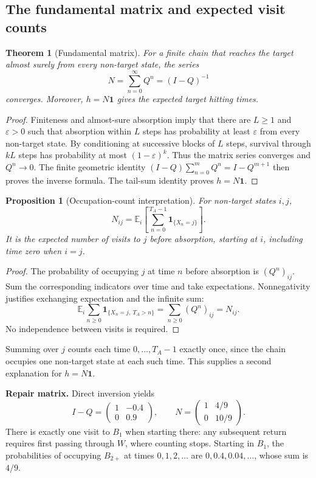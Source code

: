 \documentclass[11pt]{article}
\newtheorem{theorem}[definition]{Theorem}
\newtheorem{proposition}[definition]{Proposition}
\theoremstyle{remark}\newtheorem{remark}[definition]{Remark}
\newcommand{\E}{\mathbb E}\newcommand{\Prob}{\mathbb P}
\begin{document}
\clearpage
\subsection{The fundamental matrix and expected visit counts}
\begin{theorem}[Fundamental matrix]
For a finite chain that reaches the target almost surely from every non-target state, the series
\[
\boxed{N=\sum_{n=0}^\infty Q^n=(I-Q)^{-1}}
\]
converges. Moreover, $h=N\mathbf1$ gives the expected target hitting times.
\end{theorem}
\begin{proof}
Finiteness and almost-sure absorption imply that there are $L\geq1$ and $\varepsilon>0$ such that absorption within $L$ steps has probability at least $\varepsilon$ from every non-target state. By conditioning at successive blocks of $L$ steps, survival through $kL$ steps has probability at most $(1-\varepsilon)^k$. Thus the matrix series converges and $Q^n\to0$. The finite geometric identity
$(I-Q)\sum_{n=0}^mQ^n=I-Q^{m+1}$
then proves the inverse formula. The tail-sum identity proves $h=N\mathbf1$.
\end{proof}
\begin{proposition}[Occupation-count interpretation]
For non-target states $i,j$,
\[
\boxed{N_{ij}=\E_i\!\left[\sum_{n=0}^{T_A-1}\mathbf1_{\{X_n=j\}}\right].}
\]
It is the expected number of visits to $j$ before absorption, starting at $i$, including time zero when $i=j$.
\end{proposition}
\begin{proof}
The probability of occupying $j$ at time $n$ before absorption is $(Q^n)_{ij}$. Sum the corresponding indicators over time and take expectations. Nonnegativity justifies exchanging expectation and the infinite sum:
\[
\E_i\sum_{n\geq0}\mathbf1_{\{X_n=j,\ T_A>n\}}
=\sum_{n\geq0}(Q^n)_{ij}=N_{ij}.
\]
No independence between visits is required.
\end{proof}
Summing over $j$ counts each time $0,\ldots,T_A-1$ exactly once, since the chain occupies one non-target state at each such time. This supplies a second explanation for $h=N\mathbf1$.

\textbf{Repair matrix.} Direct inversion yields
\[
I-Q=\begin{pmatrix}1&-0.4\\0&0.9\end{pmatrix},\qquad
N=\begin{pmatrix}1&4/9\\0&10/9\end{pmatrix}.
\]
There is exactly one visit to $B_1$ when starting there: any subsequent return requires first passing through $W$, where counting stops. Starting in $B_1$, the probabilities of occupying $B_{2+}$ at times $0,1,2,\ldots$ are $0,0.4,0.04,\ldots$, whose sum is $4/9$.
\end{document}
